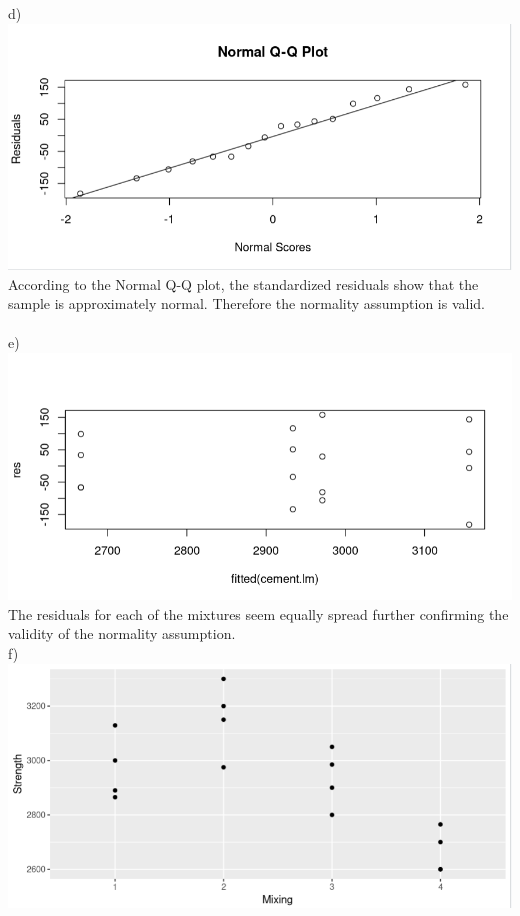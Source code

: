 \documentclass{article}
\begin{document}
\newpage
d)
\\\includegraphics{9.3d.PNG}
\\According to the Normal Q-Q plot, the standardized residuals show that the sample is approximately normal. Therefore the normality assumption is valid.
\\
\\e)
\\\includegraphics{9.3e.PNG}
\\The residuals for each of the mixtures seem equally spread further confirming the validity of the normality assumption.
\newpage
\\f) 
\\\includegraphics{3.9f.PNG}
\end{document}
